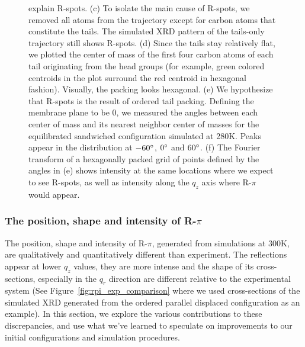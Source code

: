 \documentclass[journal=jpcbfk,manuscript=article]{achemso}
\begin{document}
\begin{figure}[!htb]
{      explain R-spots. (c) To isolate the main cause of R-spots, we removed all atoms
      from the trajectory except for carbon atoms that constitute the tails. The
      simulated XRD pattern of the tails-only trajectory still shows R-spots. (d)
      Since the tails stay relatively flat, we plotted the center of mass of the first
      four carbon atoms of each tail originating from the head groups (for example,
      green colored centroids in the plot surround the red centroid in hexagonal fashion).
      Visually, the packing looks hexagonal. (e) We hypothesize
      that R-spots is the result of ordered tail packing. Defining
      the membrane plane to be 0\degree, we measured the angles between each center of 
      mass and its nearest neighbor center of masses for the equilibrated 
      sandwiched configuration simulated at 280K. Peaks appear in the distribution at 
      $-60\degree$, $0\degree$ and $60\degree$. (f) The Fourier transform of a hexagonally
      packed grid of points defined by the angles in (e) shows intensity at the same
      locations where we expect to see R-spots, as well as intensity along the $q_z$ axis
      where R-$\pi$ would appear.}~\label{fig:tail_packing}
  \end{figure}  

  \subsubsection{The position, shape and intensity of R-$\pi$}\label{section:rpi}

  The position, shape and intensity of R-$\pi$, generated from simulations at 300K, are 
  qualitatively and quantitatively different than experiment. The reflections appear
  at lower $q_z$ values, they are more intense and the shape of its cross-sections, 
  especially in the $q_r$ direction are different relative to the experimental system
  (See Figure~\ref{fig:rpi_exp_comparison} where we used cross-sections of the simulated
  XRD generated from the ordered parallel displaced configuration as an example). In 
  this section, we explore the various contributions to these discrepancies, and use what
  we've learned to speculate on improvements to our initial configurations and simulation
  procedures.
  
\end{document}

